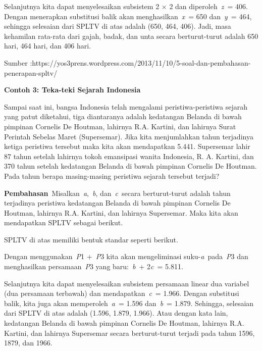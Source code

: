 \documentclass[11pt,fleqn]{book} %
\begin{document}
\noindent 

\noindent 

\noindent Selanjutnya kita dapat menyelesaikan subsistem 2 $\times$ 2 dan diperoleh~\textit{z}~= 406. Dengan menerapkan substitusi balik akan menghasilkan~\textit{x}~= 650 dan~\textit{y}~= 464, sehingga selesaian dari SPLTV di atas adalah (650, 464, 406). Jadi, masa kehamilan rata-rata dari gajah, badak, dan unta secara berturut-turut adalah 650 hari, 464 hari, dan 406 hari.

\noindent Sumber :https://yos3prens.wordpress.com/2013/11/10/5-soal-dan-pembahasan-penerapan-spltv/

\noindent 

\noindent \textbf{Contoh 3: Teka-teki Sejarah Indonesia}

\noindent Sampai saat ini, bangsa Indonesia telah mengalami peristiwa-peristiwa sejarah yang patut diketahui, tiga diantaranya adalah kedatangan Belanda di bawah pimpinan Cornelis De Houtman, lahirnya R.A. Kartini, dan lahirnya Surat Perintah Sebelas Maret (Supersemar). Jika kita menjumlahkan tahun terjadinya ketiga peristiwa tersebut maka kita akan mendapatkan 5.441. Supersemar lahir 87 tahun setelah lahirnya tokoh emansipasi wanita Indonesia, R. A. Kartini, dan 370 tahun setelah kedatangan Belanda di bawah pimpinan Cornelis De Houtman. Pada tahun berapa masing-masing peristiwa sejarah tersebut terjadi?

\noindent 

\noindent \textbf{Pembahasan}~Misalkan~\textit{a},~\textit{b}, dan~\textit{c}~secara berturut-turut adalah tahun terjadinya peristiwa kedatangan Belanda di bawah pimpinan Cornelis De Houtman, lahirnya R.A. Kartini, dan lahirnya Supersemar. Maka kita akan mendapatkan SPLTV sebagai berikut.

\noindent 

\noindent 

\noindent SPLTV di atas memiliki bentuk standar seperti berikut.

\noindent 

\noindent 

\noindent Dengan menggunakan~\textit{P}1 +~\textit{P}3 kita akan mengeliminasi suku-\textit{a}~pada~\textit{P}3 dan menghasilkan persamaan~\textit{P}3 yang baru:~\textit{b}~+ 2\textit{c}~= 5.811.

\noindent 

\noindent Selanjutnya kita dapat menyelesaikan subsistem persamaan linear dua variabel (dua persamaan terbawah) dan mendapatkan~\textit{c}~= 1.966. Dengan substitusi balik, kita juga akan memperoleh~\textit{a}~= 1.596 dan~\textit{b}~= 1.879. Sehingga, selesaian dari SPLTV di atas adalah (1.596, 1.879, 1.966). Atau dengan kata lain, kedatangan Belanda di bawah pimpinan Cornelis De Houtman, lahirnya R.A. Kartini, dan lahirnya Supersemar secara berturut-turut terjadi pada tahun 1596, 1879, dan 1966.
\end{document}
